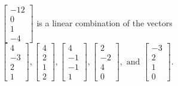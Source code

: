 \begin{exercise}
\begin{exerciseStatement}
  \end{exerciseStatement}
  \begin{exerciseAnswer}
   \(\left[\begin{array}{c}
-12 \\
0 \\
1 \\
-4
\end{array}\right]\) 
  	 is  
	a linear combination of the vectors \(\left[\begin{array}{c}
4 \\
-3 \\
2 \\
1
\end{array}\right] , \left[\begin{array}{c}
4 \\
2 \\
1 \\
2
\end{array}\right] , \left[\begin{array}{c}
4 \\
-1 \\
-1 \\
1
\end{array}\right] , \left[\begin{array}{c}
2 \\
-2 \\
4 \\
0
\end{array}\right] , \text{ and } \left[\begin{array}{c}
-3 \\
2 \\
1 \\
0
\end{array}\right]\).

	
  


  \end{exerciseAnswer}
\end{exercise}